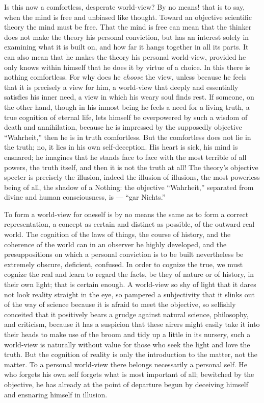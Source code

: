 \documentclass[12pt,a4paper,openany]{book}
\newcommand{\opage}[1]{\marginnote{\footnotesize\textit{[#1]}}}
\begin{document}
Is this now a comfortless, desperate world-view?
By no means! that is to say, when the mind is free and unbiased like
thought. Toward an objective scientific theory the
mind must be free. That the mind is free can mean that the thinker
does not make the theory his personal conviction, but
has an interest solely in examining what it is built on,
and how far it hangs together in all its parts. It
can also mean that he makes the theory his personal
world-view, provided he only knows within himself that
\setcounter{footnote}{0}%
\opage{16}he does it by virtue of a choice. In this there is nothing comfortless.
For why does he \emph{choose} the view, unless
because he feels that it is precisely a view for him, a
world-view that deeply and essentially satisfies his
inner need, a view in which his weary soul finds
rest. If someone, on the other hand, though in his inmost being
he feels a need for a living truth, a true cognition
of eternal life, lets himself be overpowered by such a wisdom of death
and annihilation, because he is impressed
by the supposedly objective ``Wahrheit,'' then he is in
truth comfortless. But the comfortless does not lie in
the truth; no, it lies in his own self-deception. His
heart is sick, his mind is ensnared; he imagines
that he stands face to face with the most terrible of all
powers, the truth itself, and then it is not the truth at all!
The theory's objective specter is precisely the illusion,
indeed the illusion of illusions, the most powerless being of all,
the shadow of a Nothing: the objective ``Wahrheit,'' separated from divine and
human consciousness, is --- ``gar
Nichts.''

To form a world-view for oneself is by no means the
same as to form a correct representation, a concept as
certain and distinct as possible, of the outward
real world. The cognition of the laws of things, the
course of history, and the coherence of the world can in an observer
be highly developed, and the presuppositions on which
a personal conviction is to be built nevertheless be
extremely obscure, deficient, confused. In order to cognize
the true, we must cognize the real and learn to
regard the facts, be they of nature or of history,
in their own light; that is certain enough. A world-view
so shy of light that it dares not look reality
\setcounter{footnote}{0}%
\opage{17}straight in the eye, so pampered a subjectivity that it slinks
out of the way of science because it is afraid to meet
the objective, so selfishly conceited that it positively bears
a grudge against natural science, philosophy, and criticism, because it has
a suspicion that these airers might easily take it into their heads
to make use of the broom and tidy up a little in its
nursery, such a world-view is naturally
without value for those who seek the light and love the truth.
But the cognition of reality is only the introduction to the matter,
not the matter. To a personal world-view there belongs
necessarily a personal self. He who forgets his own
self forgets what is most important of all; bewitched by the objective,
he has already at the point of departure begun by
deceiving himself and ensnaring himself in illusion.
\end{document}
